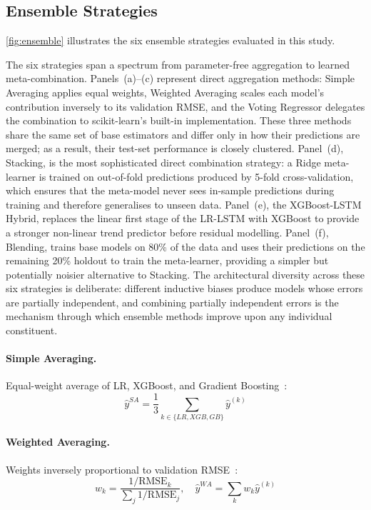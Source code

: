 \documentclass[a4paper,fleqn]{cas-dc}
\begin{document}
\subsection{Ensemble Strategies}
\label{sec:ensembles}

\autoref{fig:ensemble} illustrates the six ensemble strategies evaluated in this study.

The six strategies span a spectrum from parameter-free aggregation to learned meta-combination.  Panels~(a)--(c) represent direct aggregation methods: Simple Averaging applies equal weights, Weighted Averaging scales each model's contribution inversely to its validation RMSE, and the Voting Regressor delegates the combination to scikit-learn's built-in implementation.  These three methods share the same set of base estimators and differ only in how their predictions are merged; as a result, their test-set performance is closely clustered.  Panel~(d), Stacking, is the most sophisticated direct combination strategy: a Ridge meta-learner is trained on out-of-fold predictions produced by 5-fold cross-validation, which ensures that the meta-model never sees in-sample predictions during training and therefore generalises to unseen data.  Panel~(e), the XGBoost-LSTM Hybrid, replaces the linear first stage of the LR-LSTM with XGBoost to provide a stronger non-linear trend predictor before residual modelling.  Panel~(f), Blending, trains base models on 80\% of the data and uses their predictions on the remaining 20\% holdout to train the meta-learner, providing a simpler but potentially noisier alternative to Stacking.  The architectural diversity across these six strategies is deliberate: different inductive biases produce models whose errors are partially independent, and combining partially independent errors is the mechanism through which ensemble methods improve upon any individual constituent.

\paragraph{Simple Averaging.} Equal-weight average of LR, XGBoost, and Gradient Boosting~\cite{scikit-learn}:
\begin{equation}
  \hat{y}^{SA} = \frac{1}{3}\sum_{k \in \{LR, XGB, GB\}} \hat{y}^{(k)}
  \label{eq:simple_avg}
\end{equation}

\paragraph{Weighted Averaging.} Weights inversely proportional to validation RMSE~\cite{breiman2001rf}:
\begin{equation}
  w_k = \frac{1/\text{RMSE}_k}{\sum_j 1/\text{RMSE}_j}, \quad \hat{y}^{WA} = \sum_k w_k \hat{y}^{(k)}
  \label{eq:weighted_avg}
\end{equation}
\end{document}
